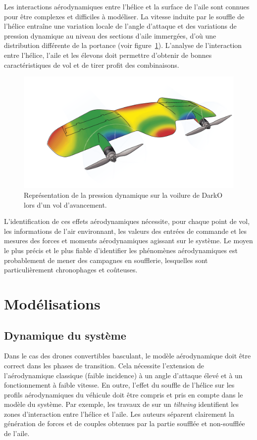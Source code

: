     Les interactions aérodynamiques entre l'hélice et la surface de l'aile sont connues pour être complexes et difficiles à modéliser. La vitesse induite par le souffle de l'hélice entraîne une variation locale de l'angle d'attaque et des variations de pression dynamique au niveau des sections d'aile immergées, d'où une distribution différente de la portance (voir figure~\ref{fig:darkoAirPress}). L'analyse de l'interaction entre l'hélice, l'aile et les élevons doit permettre d'obtenir de bonnes caractéristiques de vol et de tirer profit des combinaisons.

    \begin{figure}[ht!]
        \centering
            \includegraphics[width=0.6\columnwidth]{figures/Darko-air-pressure.png}
            \caption{Représentation de la pression dynamique sur la voilure de DarkO lors d'un vol d'avancement.}
            \label{fig:darkoAirPress}
    \end{figure}

     L'identification de ces effets aérodynamiques nécessite, pour chaque point de vol, les informations de l'air environnant, les valeurs des entrées de commande et les mesures des forces et moments aérodynamiques agissant sur le système. Le moyen le plus précis et le plus fiable d'identifier les phénomènes aérodynamiques est probablement de mener des campagnes en soufflerie, lesquelles sont particulièrement chronophages et coûteuses.


\section{Modélisations}
\label{sec:modelisation}

\subsection{Dynamique du système}
Dans le cas des drones convertibles basculant, le modèle aérodynamique doit être correct dans les phases de transition. Cela nécessite l'extension de l'aérodynamique classique (faible incidence) à un angle d'attaque élevé et à un fonctionnement à faible vitesse. En outre, l'effet du souffle de l'hélice sur les profils aérodynamiques du véhicule doit être compris et pris en compte dans le modèle du système. Par exemple, les travaux de \cite{9444145} sur un \textit{tiltwing} identifient les zones d'interaction entre l'hélice et l'aile. Les auteurs séparent clairement la génération de forces et de couples obtenues par la partie soufflée et non-soufflée de l'aile.


